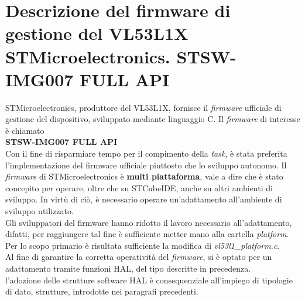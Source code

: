 
\section{Descrizione del firmware di gestione del VL53L1X STMicroelectronics. STSW-IMG007 FULL API}
STMicroelectronics, produttore del VL53L1X, fornisce il \textit{firmware} ufficiale di gestione del dispositivo, sviluppato mediante linguaggio C. Il \textit{firmware} di interesse è chiamato\\\textbf{STSW-IMG007 FULL API}\\
Con il fine di risparmiare tempo per il compimento della \textit{task}, è stata preferita l'implementazione del firmware ufficiale piuttosto che lo sviluppo autonomo.
Il \textit{firmware} di STMicroelectronics è \textbf{multi piattaforma}, vale a dire che è stato concepito per operare, oltre che su STCubeIDE, anche su altri ambienti di sviluppo.
In virtù di ciò, è necessario operare un'adattamento all'ambiente di sviluppo utilizzato.\\
Gli sviluppatori del firmware hanno ridotto il lavoro necessario all'adattamento, difatti, per raggiungere tal fine è sufficiente metter mano alla cartella \textit{platform}. Per lo scopo primario è risultata sufficiente la modifica di \textit{vl53l1\_platform.c}.\\
Al fine di garantire la corretta operatività del \textit{firmware}, si è optato per un adattamento tramite funzioni HAL, del tipo descritte in precedenza.\\
l'adozione delle strutture software HAL è consequenziale all'impiego di tipologie di dato, strutture, introdotte nei paragrafi precedenti.
 
